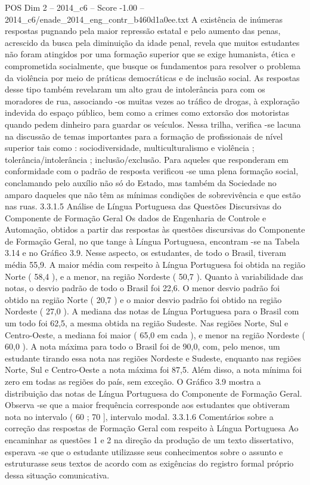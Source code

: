 \begin{textsample}{POS Dim 2 – 2014\_c6 – Score -1.00 – 2014\_c6/enade\_2014\_eng\_contr\_b460d1a0ee.txt}
A existência de inúmeras respostas pugnando pela maior repressão estatal e pelo aumento das penas, acrescido da busca pela diminuição da idade penal, revela que muitos estudantes não foram atingidos por uma formação superior que se exige humanista, ética e comprometida socialmente, que busque os fundamentos para resolver o problema da violência por meio de práticas democráticas e de inclusão social.
As respostas desse tipo também revelaram um alto grau de intolerância para com os moradores de rua, associando -os muitas vezes ao tráfico de drogas, à exploração indevida do espaço público, bem como a crimes como extorsão dos motoristas quando pedem dinheiro para guardar os veículos.
Nessa trilha, verifica -se lacuna na discussão de temas importantes para a formação de profissionais de nível superior tais como : sociodiversidade, multiculturalismo e violência ; tolerância/intolerância ; inclusão/exclusão.
Para aqueles que responderam em conformidade com o padrão de resposta verificou -se uma plena formação social, conclamando pelo auxílio não só do Estado, mas também da Sociedade no amparo daqueles que não têm as mínimas condições de sobrevivência e que estão nas ruas. 3.3.1.5 Análise de Língua Portuguesa das Questões Discursivas do Componente de Formação Geral Os dados de Engenharia de Controle e Automação, obtidos a partir das respostas às questões discursivas do Componente de Formação Geral, no que tange à Língua Portuguesa, encontram -se na Tabela 3.14 e no Gráfico 3.9.
Nesse aspecto, os estudantes, de todo o Brasil, tiveram média 55,9.
A maior média com respeito à Língua Portuguesa foi obtida na região Norte ( 58,4 ), e a menor, na região Nordeste ( 50,7 ).
Quanto à variabilidade das notas, o desvio padrão de todo o Brasil foi 22,6.
O menor desvio padrão foi obtido na região Norte ( 20,7 ) e o maior desvio padrão foi obtido na região Nordeste ( 27,0 ).
A mediana das notas de Língua Portuguesa para o Brasil com um todo foi 62,5, a mesma obtida na região Sudeste.
Nas regiões Norte, Sul e Centro-Oeste, a mediana foi maior ( 65,0 em cada ), e menor na região Nordeste ( 60,0 ).
A nota máxima para todo o Brasil foi de 90,0, com, pelo menos, um estudante tirando essa nota nas regiões Nordeste e Sudeste, enquanto nas regiões Norte, Sul e Centro-Oeste a nota máxima foi 87,5.
Além disso, a nota mínima foi zero em todas as regiões do país, sem exceção.
O Gráfico 3.9 mostra a distribuição das notas de Língua Portuguesa do Componente de Formação Geral.
Observa -se que a maior frequência corresponde aos estudantes que obtiveram nota no intervalo ( 60 ; 70 ], intervalo modal. 3.3.1.6 Comentários sobre a correção das respostas de Formação Geral com respeito à Língua Portuguesa Ao encaminhar as questões 1 e 2 na direção da produção de um texto dissertativo, esperava -se que o estudante utilizasse seus conhecimentos sobre o assunto e estruturasse seus textos de acordo com as exigências do registro formal próprio dessa situação comunicativa.

\end{textsample}
